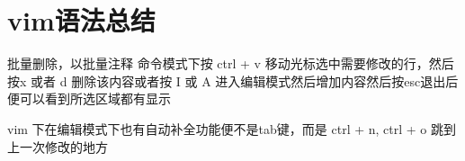 \chapter{vim语法总结}


批量删除，以批量注释
命令模式下按 ctrl + v  移动光标选中需要修改的行，然后按x 或者 d 删除该内容或者按 I 或 A 进入编辑模式然后增加内容然后按esc退出后便可以看到所选区域都有显示

vim 下在编辑模式下也有自动补全功能便不是tab键，而是 ctrl + n,
ctrl + o 跳到上一次修改的地方